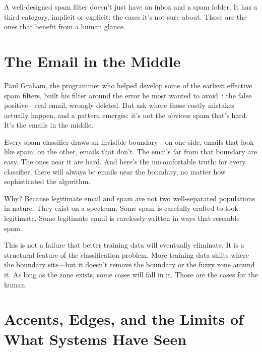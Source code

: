 A well-designed spam filter doesn't just have an inbox and a spam folder. It has a third category, implicit or explicit: the cases it's not sure about. Those are the ones that benefit from a human glance.

\section{The Email in the Middle}
\label{sec:email-middle}

Paul Graham, the programmer who helped develop some of the earliest effective spam filters, built his filter around the error he most wanted to avoid~\autocite{graham2002spam}: the false positive---real email, wrongly deleted. But ask where those costly mistakes actually happen, and a pattern emerges: it's not the obvious spam that's hard. It's the emails in the middle.

Every spam classifier draws an invisible boundary---on one side, emails that look like spam; on the other, emails that don't. The emails far from that boundary are easy. The ones near it are hard. And here's the uncomfortable truth: for every classifier, there will always be emails near the boundary, no matter how sophisticated the algorithm.

Why? Because legitimate email and spam are not two well-separated populations in nature. They exist on a spectrum. Some spam is carefully crafted to look legitimate. Some legitimate email is carelessly written in ways that resemble spam.

\begin{keyconcept}
This is not a failure that better training data will eventually eliminate. It is a structural feature of the classification problem. More training data shifts where the boundary sits---but it doesn't remove the boundary or the fuzzy zone around it. As long as the zone exists, some cases will fall in it. Those are the cases for the human.
\end{keyconcept}

\section{Accents, Edges, and the Limits of What Systems Have Seen}
\label{sec:accents-edges}

